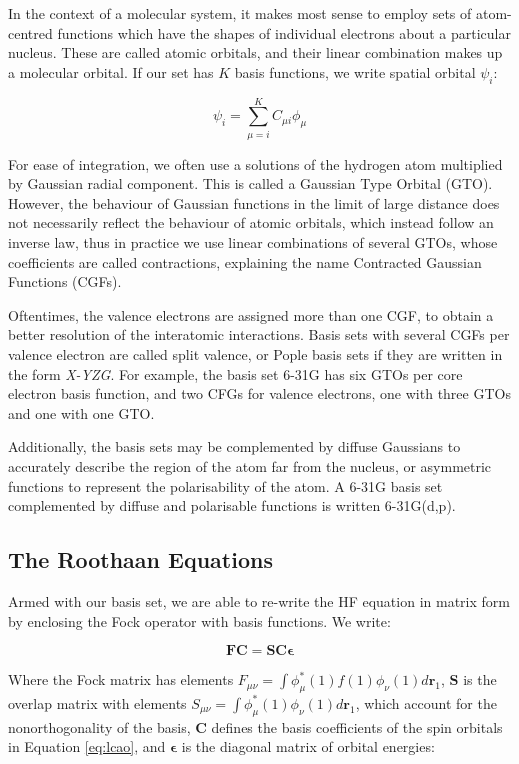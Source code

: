 In the context of a molecular system, it makes most sense to employ sets of atom-centred functions which have the shapes of individual electrons about a particular nucleus. These are called atomic orbitals, and their linear combination makes up a molecular orbital. If our set has $K$ basis functions, we write spatial orbital $\psi_i$:

\begin{equation}
    \psi_{i} = \sum_{\mu = i}^K C_{\mu i}\phi_{\mu}
    \label{eq:lcao}
\end{equation}

For ease of integration, we often use a solutions of the hydrogen atom multiplied by Gaussian radial component. This is called a Gaussian Type Orbital (GTO). However, the behaviour of Gaussian functions in the limit of large distance does not necessarily reflect the behaviour of atomic orbitals, which instead follow an inverse law, thus in practice we use linear combinations of several GTOs, whose coefficients are called contractions, explaining the name Contracted Gaussian Functions (CGFs).

Oftentimes, the valence electrons are assigned more than one CGF, to obtain a better resolution of the interatomic interactions. Basis sets with several CGFs per valence electron are called split valence, or Pople basis sets if they are written in the form \textit{X-YZG}. For example, the basis set 6-31G has six GTOs per core electron basis function, and two CFGs for valence electrons, one with three GTOs and one with one GTO.

Additionally, the basis sets may be complemented by diffuse Gaussians to accurately describe the region of the atom far from the nucleus, or asymmetric functions to represent the polarisability of the atom. A 6-31G basis set complemented by diffuse and polarisable functions is written 6-31G(d,p).

\subsection{The Roothaan Equations}

Armed with our basis set, we are able to re-write the HF equation in matrix form by enclosing the Fock operator with basis functions. We write:

\begin{equation}
    \bm{F} \bm{C} = \bm{S} \bm{C} \bm{\epsilon}    
\label{eq:rooth}
\end{equation}

Where the Fock matrix has elements $F_{\mu \nu} = \int \phi^*_{\mu}(1)f(1)\phi_{\nu}(1)d\bm{r}_1$, $\bm{S}$ is the overlap matrix with elements $S_{\mu \nu} = \int \phi_{\mu}^*(1) \phi_{\nu}(1) d\bm{r}_1$, which account for the nonorthogonality of the basis, $\bm{C}$ defines the basis coefficients of the spin orbitals in Equation \ref{eq:lcao}, and $\bm{\epsilon}$ is the diagonal matrix of orbital energies:

